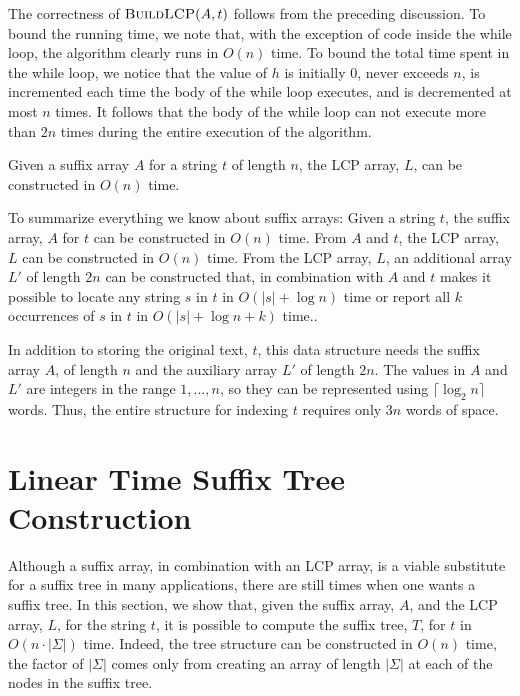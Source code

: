 The correctness of $\textsc{BuildLCP}(A,t)$ follows from the preceding
discussion. To bound the running time, we note that, with the exception of
code inside the while loop, the algorithm clearly runs in $O(n)$ time. To
bound the total time spent in the while loop, we notice that the value
of $h$ is initially 0, never exceeds $n$, is incremented each time the
body of the while loop executes, and is decremented at most $n$ times.
It follows that the body of the while loop can not execute more than $2n$
times during the entire execution of the algorithm.

\begin{thm}
  Given a suffix array $A$ for a string $t$ of length $n$, the LCP array,
  $L$, can be constructed in $O(n)$ time.
\end{thm}

To summarize everything we know about suffix arrays:  Given a string $t$,
the suffix array, $A$ for $t$ can be constructed in $O(n)$ time. From
$A$ and $t$, the LCP array, $L$ can be constructed in $O(n)$ time.
From the LCP array, $L$, an additional array $L'$ of length $2n$ can be
constructed that, in combination with $A$ and $t$ makes it possible to
locate any string $s$ in $t$ in $O(|s|+\log n)$ time or report all $k$
occurrences of $s$ in $t$ in $O(|s|+\log n+ k)$ time..

In addition to storing the original text, $t$, this data structure needs
the suffix array $A$, of length $n$ and the auxiliary array $L'$ of length
$2n$. The values in $A$ and $L'$ are integers in the range $1,\ldots,n$,
so they can be represented using $\lceil\log_2 n\rceil$ words.  Thus,
the entire structure for indexing $t$ requires only $3n$ words of space.

\section{Linear Time Suffix Tree Construction}

Although a suffix array, in combination with an LCP array, is a viable substitute for a suffix tree in many applications, there are still times when one wants a suffix tree.  In this section, we show that, given the suffix array, $A$, and the LCP array, $L$, for the string $t$, it is possible to compute the suffix tree, $T$, for $t$ in $O(n\cdot|\Sigma|)$ time.  Indeed, the tree structure can be constructed in $O(n)$ time, the factor of $|\Sigma|$ comes only from creating an array of length $|\Sigma|$ at each of the nodes in the suffix tree.

